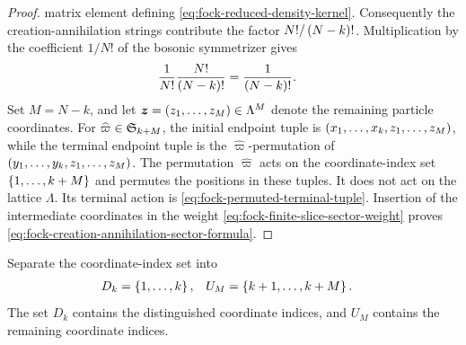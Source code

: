 \documentclass[11pt,a4paper]{article}
\theoremstyle{plain}
\theoremstyle{definition}
\theoremstyle{remark}
\begin{document}
\begin{proof}
matrix element defining \eqref{eq:fock-reduced-density-kernel}.
Consequently the creation-annihilation strings contribute the factor
$N!/\left( N-k \right)!$.
Multiplication by the coefficient $1/N!$ of the bosonic symmetrizer gives
$$\begin{aligned}
\frac{1}{N!}\frac{N!}{\left( N-k \right)!}
& =
\frac{1}{\left( N-k \right)!}.
\end{aligned}$$
Set $M = N-k$, and let $\boldsymbol{z} = \left( z_1,\ldots,z_M \right) \in \Lambda^M$ denote the remaining particle
coordinates.
For $\widehat{\varpi} \in \grsym{k+M}$, the initial endpoint tuple is
$\left( x_1,\ldots,x_k,z_1,\ldots,z_M \right)$, while the terminal endpoint tuple is the
$\widehat{\varpi}$-permutation of
$\left( y_1,\ldots,y_k,z_1,\ldots,z_M \right)$.
The permutation $\widehat{\varpi}$ acts on the coordinate-index set $\left\{ 1,\ldots,k+M \right\}$ and permutes the
positions in these tuples.
It does not act on the lattice $\Lambda$.
Its terminal action is \eqref{eq:fock-permuted-terminal-tuple}.
Insertion of the intermediate coordinates in the weight
\eqref{eq:fock-finite-slice-sector-weight} proves
\eqref{eq:fock-creation-annihilation-sector-formula}.
\end{proof}

Separate the coordinate-index set into \[\begin{aligned}
D_k
& =
\left\{ 1,\ldots,k \right\},
&
U_M
& =
\left\{ k+1,\ldots,k+M \right\}.
\end{aligned}\] The set \(D_k\) contains the distinguished coordinate indices, and \(U_M\) contains the remaining coordinate indices.
\end{document}
